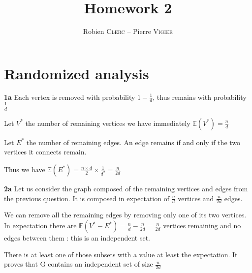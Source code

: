 \documentclass[10pt,a4paper]{article}
\title{Homework 2}
\author{Robien \textsc{Clerc} -- Pierre \textsc{Vigier}}
\theoremstyle{plain}
\begin{document}
\maketitle

\section{Randomized analysis}

\textbf{1a} Each vertex is removed with probability $1 - \frac{1}{d}$, thus remains with probability $\frac{1}{d}$

Let $V^*$ the number of remaining vertices we have immediately $\mathbb{E}(V^*) = \frac{n}{d}$

Let $E^*$ the number of remaining edges. An edge remains if and only if the two vertices it connects remain.

Thus we have $\mathbb{E}(E^*) = \frac{n \times d}{2} \times \frac{1}{d^2} = \frac{n}{2d}$

\textbf{2a} Let us consider the graph composed of the remaining vertices and edges from the previous question. It is composed in expectation of $\frac{n}{d}$ vertices and $\frac{n}{2d}$ edges.

We can remove all the remaining edges by removing only one of its two vertices. In expectation there are $\mathbb{E}(V^* - E^*) = \frac{n}{d} - \frac{n}{2d} = \frac{n}{2d}$ vertices remaining and no edges between them : this is an independent set.

There is at least one of those subsets with a value at least the expectation. It proves that G contains an independent set of size $\frac{n}{2d}$
\end{document}
